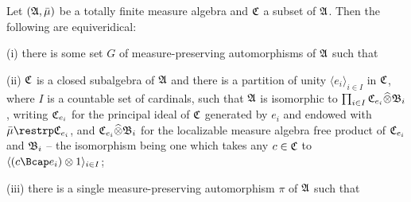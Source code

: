 \medskip

 Let $(\frak A,\bar\mu)$ be a totally finite
measure algebra and $\frak C$ a subset of $\frak A$.
Then the following are equiveridical:

(i) there is some set $G$ of measure-preserving automorphisms of
$\frak A$ such that


(ii) $\frak C$ is a closed subalgebra of $\frak A$ and there is a
partition of unity $\langle e_i\rangle_{i\in I}$ in $\frak C$, where $I$
is a countable set of cardinals, such that $\frak A$ is
isomorphic to $\prod_{i\in I}\frak C_{e_i}\widehat{\otimes}\frak B_i$,
writing $\frak C_{e_i}$ for the principal ideal of $\frak C$ generated
by $e_i$ and endowed with $\bar\mu\restrp\frak C_{e_i}$, and
$\frak C_{e_i}\widehat{\otimes}\frak B_i$ for the localizable measure
algebra
free product of $\frak C_{e_i}$ and $\frak B_i$ -- the isomorphism being
one which takes any $c\in\frak C$ to
$\langle (c\Bcap e_i)\otimes 1\rangle_{i\in I}$;

(iii) there is a single measure-preserving automorphism $\pi$ of
$\frak A$ such that


